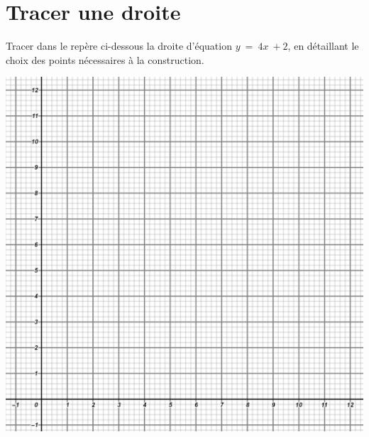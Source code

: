 \section{Tracer une droite}

\begin{questions}
	\question[5] Tracer dans le repère ci-dessous la droite d'équation $y\: = \: 4x \: + 2$, en détaillant le choix des points nécessaires à la construction.
	
	\begin{center}
		\includegraphics[scale=0.25]{img/vide_2}
	\end{center}

	\fillwithdottedlines{6cm}
\end{questions}
